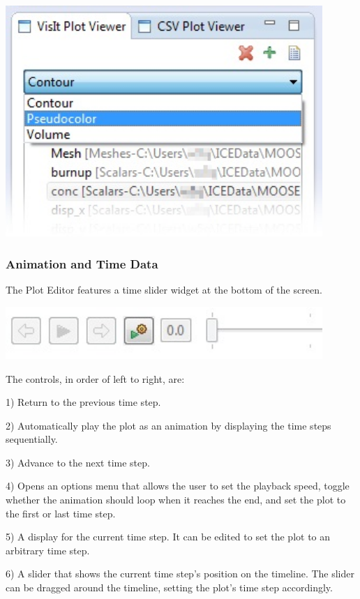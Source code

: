 \documentclass{article}
\begin{document}
\begin{center}
\includegraphics[width=12cm]{images/VisItRepresentationDropDown}
\end{center}

\subsubsection{Animation and Time Data}

The Plot Editor features a time slider widget at the bottom of the screen. 

\begin{center}
\includegraphics[width=12cm]{images/TimeSliderWidget}
\end{center}

The controls, in order of left to right, are:

1) Return to the previous time step.

2) Automatically play the plot as an animation by displaying the time steps
sequentially. 

3) Advance to the next time step. 

4) Opens an options menu that allows the user to set the playback speed, toggle
whether the animation should loop when it reaches the end, and set the plot to
the first or last time step.

5) A display for the current time step. It can be edited to set the plot to an
arbitrary time step. 

6) A slider that shows the current time step's position on the timeline. The
slider can be dragged around the timeline, setting the plot's time step
accordingly.
\end{document}
